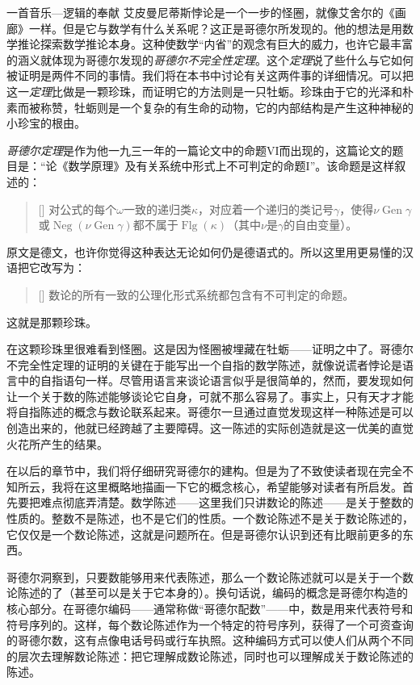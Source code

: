 \begin{intro}{一首音乐—逻辑的奉献}
艾皮曼尼蒂斯悖论是一个一步的怪圈，就像艾舍尔的《画廊》一样。但是它与数学有什么关系呢？这正是哥德尔所发现的。他的想法是用数学推论探索数学推论本身。这种使数学“内省”的观念有巨大的威力，也许它最丰富的涵义就体现为哥德尔发现的\emph{哥德尔不完全性定理}。这个\emph{定理}说了些什么与它如何被证明是两件不同的事情。我们将在本书中讨论有关这两件事的详细情况。可以把这一\emph{定理}比做是一颗珍珠，而证明它的方法则是一只牡蛎。珍珠由于它的光泽和朴素而被称赞，牡蛎则是一个复杂的有生命的动物，它的内部结构是产生这种神秘的小珍宝的根由。

\emph{哥德尔定理}是作为他一九三一年的一篇论文中的命题VI而出现的，这篇论文的题目是：“论《数学原理》及有关系统中形式上不可判定的命题I”。该命题是这样叙述的：

\begin{quote}[]
对公式的每个$\omega$一致的递归类$\kappa$，对应着一个递归的类记号$\gamma$，使得$\nu\operatorname{Gen}\gamma$或$\operatorname{Neg}(\nu\operatorname{Gen}\gamma)$都不属于$\operatorname{Flg}(\kappa)$（其中$\nu$是$\gamma$的自由变量）。
\end{quote}
原文是德文，也许你觉得这种表达无论如何仍是德语式的。所以这里用更易懂的汉语把它改写为：

\begin{quote}[]
数论的所有一致的公理化形式系统都包含有不可判定的命题。
\end{quote}
这就是那颗珍珠。

在这颗珍珠里很难看到怪圈。这是因为怪圈被埋藏在牡蛎——证明之中了。哥德尔不完全性定理的证明的关键在于能写出一个自指的数学陈述，就像说谎者悖论是语言中的自指语句一样。尽管用语言来谈论语言似乎是很简单的，然而，要发现如何让一个关于数的陈述能够谈论它自身，可就不那么容易了。事实上，只有天才才能将自指陈述的概念与数论联系起来。哥德尔一旦通过直觉发现这样一种陈述是可以创造出来的，他就已经跨越了主要障碍。这一陈述的实际创造就是这一优美的直觉火花所产生的结果。

在以后的章节中，我们将仔细研究哥德尔的建构。但是为了不致使读者现在完全不知所云，我将在这里概略地描画一下它的概念核心，希望能够对读者有所启发。首先要把难点彻底弄清楚。数学陈述——这里我们只讲数论的陈述——是关于整数的性质的。整数不是陈述，也不是它们的性质。一个数论陈述不是关于数论陈述的，它仅仅是一个数论陈述，这就是问题所在。但是哥德尔认识到还有比眼前更多的东西。

哥德尔洞察到，只要数能够用来代表陈述，那么一个数论陈述就可以是关于一个数论陈述的了（甚至可以是关于它本身的）。换句话说，编码的概念是哥德尔构造的核心部分。在哥德尔编码——通常称做“哥德尔配数”——中，数是用来代表符号和符号序列的。这样，每个数论陈述作为一个特定的符号序列，获得了一个可资查询的哥德尔数，这有点像电话号码或行车执照。这种编码方式可以使人们从两个不同的层次去理解数论陈述：把它理解成数论陈述，同时也可以理解成关于数论陈述的陈述。


\end{intro}
